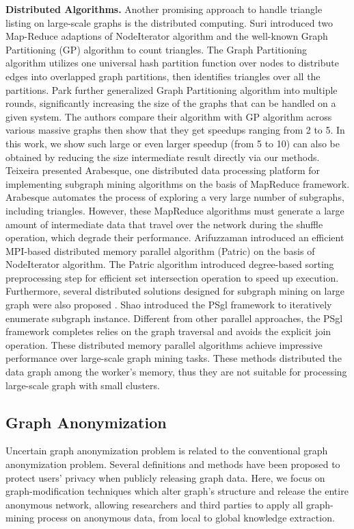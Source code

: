 \hspace{-1em}\textbf{Distributed Algorithms.} 
Another promising approach to handle triangle listing on large-scale graphs is the distributed computing. Suri {\etal} \cite{Suri_Vassilvitskii_2011} introduced two Map-Reduce adaptions of NodeIterator algorithm and the well-known Graph Partitioning (GP) algorithm to count triangles. The Graph Partitioning algorithm utilizes one universal hash partition function over nodes to distribute edges into overlapped graph partitions, then identifies triangles over all the partitions. Park {\etal} \cite{parkmapreduce2014} further generalized Graph Partitioning algorithm into multiple rounds, significantly increasing the size of the graphs that can be handled on a given system. The authors compare their algorithm with GP algorithm \cite{Suri_Vassilvitskii_2011} across various massive graphs then show that they get speedups ranging from 2 to 5. In this work, we show such large or even larger speedup (from 5 to 10) can also be obtained by reducing the size intermediate result directly via our methods. Teixeira {\etal} \cite{Teixeira_2015} presented Arabesque, one distributed data processing platform for implementing subgraph mining algorithms on the basis of MapReduce framework.  Arabesque automates the process of exploring a very large number of subgraphs, including triangles. However, these MapReduce algorithms must generate a large amount of intermediate data that travel over the network during the shuffle operation, which degrade their performance. Arifuzzaman {\etal} \cite{Patric} introduced an efficient MPI-based distributed memory parallel algorithm (Patric) on the basis of NodeIterator algorithm. The Patric algorithm introduced degree-based sorting preprocessing step for efficient set intersection operation to speed up execution. 
Furthermore, several distributed solutions designed for subgraph mining on large graph were also proposed \cite{Pregel,Shao_2014}. Shao {\etal} introduced the PSgl framework  to iteratively enumerate subgraph instance. Different from other parallel approaches, the PSgl framework completes relies on the graph traversal and avoids the explicit join operation. These distributed memory parallel algorithms achieve impressive performance over large-scale graph mining tasks. These methods distributed the data graph among the worker's memory, thus they are not suitable for processing large-scale graph with small clusters.

\subsection{Graph Anonymization}
Uncertain graph anonymization problem is related to the conventional graph anonymization problem. Several definitions and methods have been proposed to protect users' privacy when publicly releasing graph data. Here, we focus on graph-modification techniques which alter graph's structure and release the entire anonymous network, allowing researchers and third parties to apply all graph-mining process on anonymous data, from local to global knowledge extraction. 

